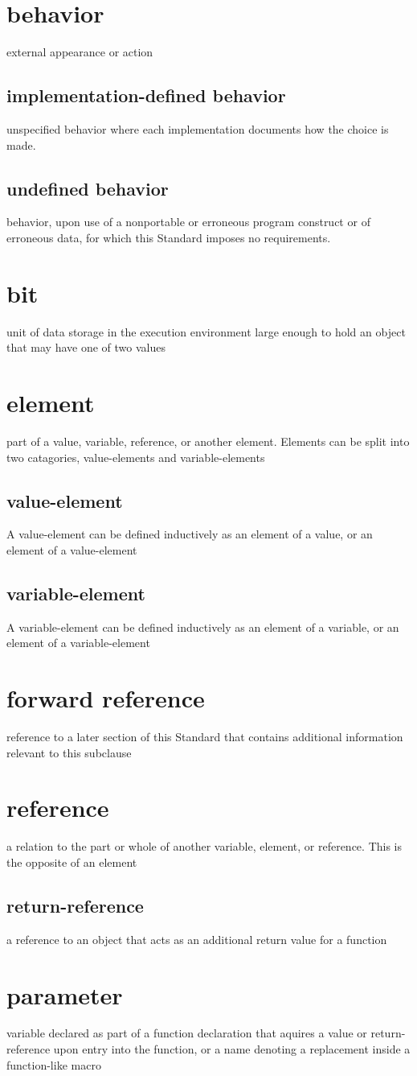 \section{behavior}
external appearance or action
\subsection{implementation-defined behavior}
unspecified behavior where each implementation documents how the choice is made.
\subsection{undefined behavior}
behavior, upon use of a nonportable or erroneous program construct or of erroneous data,
for which this Standard imposes no requirements.
\section{bit}
unit of data storage in the execution environment large enough to hold an object that may have one of two values
\section{element}
part of a value, variable, reference, or another element. Elements can be split into two catagories, value-elements and variable-elements
\subsection{value-element}
A value-element can be defined inductively as an element of a value, or an element of a value-element
\subsection{variable-element}
A variable-element can be defined inductively as an element of a variable, or an element of a variable-element
\section{forward reference}
reference to a later section of this Standard that contains additional information relevant to this subclause
\section{reference}
a relation to the part or whole of another variable, element, or reference. This is the opposite of an element
\subsection{return-reference}
a reference to an object that acts as an additional return value for a function
\section{parameter}
variable declared as part of a function declaration that aquires a value or return-reference upon entry into the function, or a name denoting a replacement inside a function-like macro

